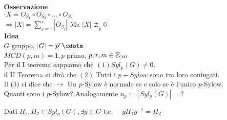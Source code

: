 \documentclass[12px]{article}
\begin{document}
	  \textbf{Osservazione}\\
	  $\cdot X = O_{S_1}\circ O_{S_2}\circ\ldots\circ O_{S_r}$\\
	  $ \Rightarrow |X| = \sum^r_{j=1} |O_{S_j}|$ Ma $|X|\not\equiv_p 0$\\
	  \textbf{Idea}\\
	  $G$ gruppo, $|G| = p^r \cdotm$\\
	  $MCD(p,m) = 1, p$ primo, $p,r,m\in\mathbb{Z}_{>0}$ \\
	  Per il I teorema sappiamo che $(1) Syl_p(G)\neq 0$.\\
	  il  II Teorema ci dirà che $(2)$ Tutti i $p-Sylow$ sono tra loro coniugati.\\
	  Il (3) ci dice che $ \rightarrow$ Un $p$-Sylow è normale se e solo se è l'unico $p$-Sylow.\\
	  Quanti sono i $p$-Sylow? Analogamente $n_p := |Syl_p(G)| = ?$\\
	  \begin{teo}
		  Dati $H_1, H_2\in Syl_p (G), \exists g\in G$ t.c. \ \ $g H_1 g^{-1} = H_2$\\
	  \end{teo}
\end{document}
